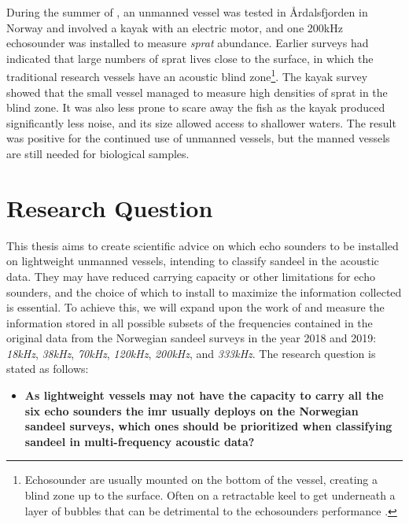        During the summer of \citeyear{johnsen2020measuring}, an unmanned vessel was tested in Årdalsfjorden in Norway and involved a kayak with an electric motor, and one 200kHz echosounder was installed to measure \textit{sprat} abundance. Earlier surveys had indicated that large numbers of sprat lives close to the surface, in which the traditional research vessels have an acoustic blind zone\footnote{Echosounder are usually mounted on the bottom of the vessel, creating a blind zone up to the surface. Often on a retractable keel to get underneath a layer of bubbles that can be detrimental to the echosounders performance \cite{korneliussen2008proposals}.}. The kayak survey showed that the small vessel managed to measure high densities of sprat in the blind zone. It was also less prone to scare away the fish as the kayak produced significantly less noise, and its size allowed access to shallower waters. The result was positive for the continued use of unmanned vessels, but the manned vessels are still needed for biological samples\cite{johnsen2020measuring}.
        


\section{Research Question}
        This thesis aims to create scientific advice on which echo sounders to be installed on lightweight unmanned vessels, intending to classify sandeel in the acoustic data. They may have reduced carrying capacity or other limitations for echo sounders, and the choice of which to install to maximize the information collected is essential. To achieve this, we will expand upon the work of \citeauthor{brautaset2020acoustic} and measure the information stored in all possible subsets of the frequencies contained in the original data from the Norwegian sandeel surveys in the year 2018 and 2019: \textit{18kHz}, \textit{38kHz}, \textit{70kHz}, \textit{120kHz}, \textit{200kHz}, and \textit{333kHz}. The research question is stated as follows:
        
        
    \begin{itemize}
        \item \textbf{As lightweight vessels may not have the capacity to carry all the six echo sounders the \gls{imr} usually deploys on the Norwegian sandeel surveys, which ones should be prioritized when classifying sandeel in multi-frequency acoustic data?}
        
    \end{itemize}



